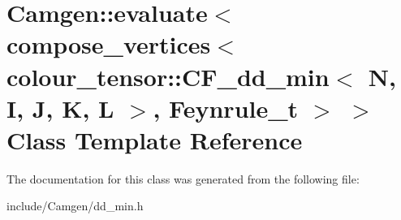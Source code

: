 \hypertarget{a00154}{\section{Camgen\-:\-:evaluate$<$ compose\-\_\-vertices$<$ colour\-\_\-tensor\-:\-:C\-F\-\_\-dd\-\_\-min$<$ N, I, J, K, L $>$, Feynrule\-\_\-t $>$ $>$ Class Template Reference}
\label{a00154}
}


The documentation for this class was generated from the following file\-:\begin{DoxyCompactItemize}
\item 
include/\-Camgen/dd\-\_\-min.\-h\end{DoxyCompactItemize}
